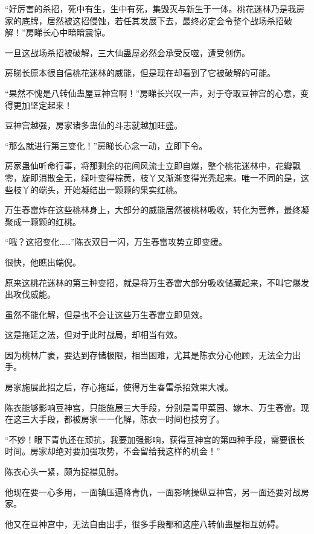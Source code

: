 
\begin{this_body}



“好厉害的杀招，死中有生，生中有死，集毁灭与新生于一体。桃花迷林乃是我房家的底牌，居然被这招侵蚀，若任其发展下去，最终必定会令整个战场杀招破解！”房睇长心中暗暗震惊。

一旦这战场杀招被破解，三大仙蛊屋必然会承受反噬，遭受创伤。

房睇长原本很自信桃花迷林的威能，但是现在却看到了它被破解的可能。

“果然不愧是八转仙蛊屋豆神宫啊！”房睇长兴叹一声，对于夺取豆神宫的心意，变得更加坚定起来！

豆神宫越强，房家诸多蛊仙的斗志就越加旺盛。

“那么就进行第三变化！”房睇长心念一动，立即下令。

房家蛊仙听命行事，将那剩余的花间风流士立即自爆，整个桃花迷林中，花瓣飘零，旋即消散全无，绿叶变得棕黄，枝丫又渐渐变得光秃起来。唯一不同的是，这些枝丫的端头，开始凝结出一颗颗的果实红桃。

万生春雷炸在这些桃林身上，大部分的威能居然被桃林吸收，转化为营养，最终凝聚成一颗颗的红桃。

“哦？这招变化……”陈衣双目一闪，万生春雷攻势立即变缓。

很快，他瞧出端倪。

原来这桃花迷林的第三种变招，就是将万生春雷大部分吸收储藏起来，不叫它爆发出攻伐威能。

虽然不能化解，但是也不会让这些万生春雷立即见效。

这是拖延之法，但对于此时战局，却相当有效。

因为桃林广袤，要达到存储极限，相当困难，尤其是陈衣分心他顾，无法全力出手。

房家施展此招之后，存心拖延，使得万生春雷杀招效果大减。

陈衣能够影响豆神宫，只能施展三大手段，分别是青甲菜园、嫁木、万生春雷。现在这三大手段，都被房家一一化解，陈衣一时间也技穷了。

“不妙！眼下青仇还在顽抗，我要加强影响，获得豆神宫的第四种手段，需要很长时间。房家却绝对要加强攻势，不会留给我这样的机会！”

陈衣心头一紧，颇为捉襟见肘。

他现在要一心多用，一面镇压逼降青仇，一面影响操纵豆神宫，另一面还要对战房家。

他又在豆神宫中，无法自由出手，很多手段都和这座八转仙蛊屋相互妨碍。


\end{this_body}
